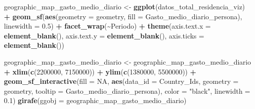 \documentclass[data,article,submit,moreauthors,pdftex]{Definitions/mdpi}
\newenvironment{Shaded}{\begin{snugshade}}{\end{snugshade}}
\newcommand{\AttributeTok}[1]{\textcolor[rgb]{0.13,0.29,0.53}{#1}}
\newcommand{\ConstantTok}[1]{\textcolor[rgb]{0.56,0.35,0.01}{#1}}
\newcommand{\DecValTok}[1]{\textcolor[rgb]{0.00,0.00,0.81}{#1}}
\newcommand{\FloatTok}[1]{\textcolor[rgb]{0.00,0.00,0.81}{#1}}
\newcommand{\FunctionTok}[1]{\textcolor[rgb]{0.13,0.29,0.53}{\textbf{#1}}}
\newcommand{\NormalTok}[1]{#1}
\newcommand{\OtherTok}[1]{\textcolor[rgb]{0.56,0.35,0.01}{#1}}
\newcommand{\SpecialCharTok}[1]{\textcolor[rgb]{0.81,0.36,0.00}{\textbf{#1}}}
\newcommand{\StringTok}[1]{\textcolor[rgb]{0.31,0.60,0.02}{#1}}
\begin{document}
\begin{Shaded}
\begin{Highlighting}[]
\NormalTok{geographic\_map\_gasto\_medio\_diario }\OtherTok{\textless{}{-}} \FunctionTok{ggplot}\NormalTok{(datos\_total\_residencia\_viz) }\SpecialCharTok{+}
    \FunctionTok{geom\_sf}\NormalTok{(}\FunctionTok{aes}\NormalTok{(}\AttributeTok{geometry =}\NormalTok{ geometry, }\AttributeTok{fill =}\NormalTok{ Gasto\_medio\_diario\_persona),}
        \AttributeTok{linewidth =} \FloatTok{0.5}\NormalTok{) }\SpecialCharTok{+} \FunctionTok{facet\_wrap}\NormalTok{(}\SpecialCharTok{\textasciitilde{}}\NormalTok{Periodo) }\SpecialCharTok{+} \FunctionTok{theme}\NormalTok{(}\AttributeTok{axis.text.x =} \FunctionTok{element\_blank}\NormalTok{(),}
    \AttributeTok{axis.text.y =} \FunctionTok{element\_blank}\NormalTok{(), }\AttributeTok{axis.ticks =} \FunctionTok{element\_blank}\NormalTok{())}

\NormalTok{geographic\_map\_gasto\_medio\_diario }\OtherTok{\textless{}{-}}\NormalTok{ geographic\_map\_gasto\_medio\_diario }\SpecialCharTok{+}
    \FunctionTok{xlim}\NormalTok{(}\FunctionTok{c}\NormalTok{(}\DecValTok{2200000}\NormalTok{, }\DecValTok{7150000}\NormalTok{)) }\SpecialCharTok{+} \FunctionTok{ylim}\NormalTok{(}\FunctionTok{c}\NormalTok{(}\DecValTok{1380000}\NormalTok{, }\DecValTok{5500000}\NormalTok{)) }\SpecialCharTok{+} \FunctionTok{geom\_sf\_interactive}\NormalTok{(}\AttributeTok{fill =} \ConstantTok{NA}\NormalTok{,}
    \FunctionTok{aes}\NormalTok{(}\AttributeTok{data\_id =}\NormalTok{ Country\_Ids, }\AttributeTok{geometry =}\NormalTok{ geometry, }\AttributeTok{tooltip =}\NormalTok{ Gasto\_medio\_diario\_persona),}
    \AttributeTok{color =} \StringTok{"black"}\NormalTok{, }\AttributeTok{linewidth =} \FloatTok{0.1}\NormalTok{)}
\FunctionTok{girafe}\NormalTok{(}\AttributeTok{ggobj =}\NormalTok{ geographic\_map\_gasto\_medio\_diario)}
\end{Highlighting}
\end{Shaded}
\end{document}
